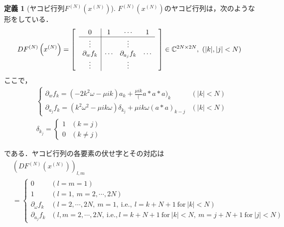 \documentclass[11pt,a4paper]{jsarticle}
\theoremstyle{definition}
\newtheorem{dfn}{定義}
\begin{document}
\begin{dfn}[ヤコビ行列$F^{(N)}\left(x^{(N)}\right)$]
  $F^{(N)}\left(x^{(N)}\right)$のヤコビ行列は，次のような形をしている．
  \begin{equation*}
    DF^{(N)}\left(x^{(N)}\right)=\begin{bmatrix}
       & \multicolumn{1}{c|}{0}              & 1      & \cdots            & 1      & \\ \cline{2-5}
       & \multicolumn{1}{c|}{\vdots}         &        & \vdots            &        & \\
       & \multicolumn{1}{c|}{\partial_w f_k} & \cdots & \partial_{a_j}f_k & \cdots & \\
       & \multicolumn{1}{c|}{\vdots}         &        & \vdots            &        & \\
    \end{bmatrix}
    \in \mathbb{C}^{2N\times 2N},\ \left(|k|,|j|<N\right)
  \end{equation*}
  ここで，
  \begin{align*}
     & \begin{cases}
         \partial_w f_k = (-2k^2\omega - \mu ik)a_k + \frac{\mu ik}(a*a*a)_k                     & (|k|<N) \\
         \partial_{a_j} f_k = (k^2\omega^2 - \mu ik\omega)\delta_{k_j} + \mu ik\omega(a*a)_{k-j} & (|k|<N)
       \end{cases}
    \\
     & \delta_{k_j} = \begin{cases}
                        1 & (k=j)     \\
                        0 & (k\neq j)
                      \end{cases}
  \end{align*}
\end{dfn}
である．ヤコビ行列の各要素の伏せ字とその対応は
\begin{align*}
   & \left(DF^{(N)}\left(x^{(N)}\right)\right)_{l,m}                                                                                        \\
   & = \begin{cases}
         0                   & \left(l=m=1\right)                                                                                             \\
         1                   & \left(l=1,\ m= 2,\cdots,2N\right)                                                                              \\
         \partial_\omega f_k & \left(l=2,\cdots,2N,\ m=1, \ \mathrm{i.e.},\ l=k+N+1 \ \mathrm{for} \ |k|<N\right)                             \\
         \partial_{a_j}f_k   & \left(l,m=2,\cdots,2N, \ \mathrm{i.e.}, l=k+N+1 \ \mathrm{for} \ |k|<N,\ m=j+N+1 \ \mathrm{for} \ |j|<N\right)
       \end{cases}
\end{align*}
\end{document}
